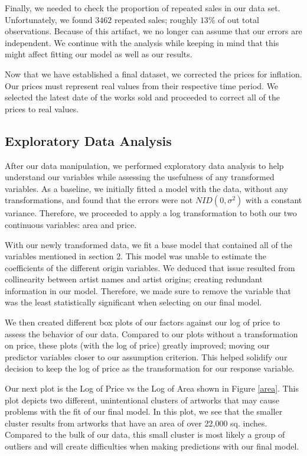 \documentclass[]{asaproc}\usepackage[]{graphicx}\usepackage[]{color}
\begin{document}
Finally, we needed to check the proportion of repeated sales in our data set. Unfortunately, we found $3462$ repeated sales; roughly $13$\% of out total observations. Because of this artifact, we no longer can assume that our errors are independent. We continue with the analysis while keeping in mind that this might affect fitting our model as well as our results.

Now that we have established a final dataset, we corrected the prices for inflation. Our prices must represent real values from their respective time period. We selected the latest date of the works sold and proceeded to correct all of the prices to real values.

\subsection{Exploratory Data Analysis}

After our data manipulation, we performed exploratory data analysis to help understand our variables while assessing the usefulness of any transformed variables. As a baseline, we initially fitted a model with the data, without any transformations, and found that the errors were not $NID(0,\sigma^2)$ with a constant variance. Therefore, we proceeded to apply a log transformation to both our two continuous variables: area and price. 

With our newly transformed data, we fit a base model that contained all of the variables mentioned in section 2. This model was unable to estimate the coefficients of the different origin variables. We deduced that issue resulted from collinearity between artist names and artist origins; creating redundant information in our model. Therefore, we made sure to remove the variable that was the least statistically significant when selecting on our final model.

We then created different box plots of our factors against our log of price to assess the behavior of our data. Compared to our plots without a transformation on price, these plots (with the log of price) greatly improved; moving our predictor variables closer to our assumption criterion. This helped solidify our decision to keep the log of price as the transformation for our response variable. 

Our next plot is the Log of Price vs the Log of Area shown in Figure \ref{area}. This plot depicts two different, unintentional clusters of artworks that may cause problems with the fit of our final model. In this plot, we see that the smaller cluster results from artworks that have an area of over 22,000 sq. inches. Compared to the bulk of our data, this small cluster is most likely a group of outliers and will create difficulties when making predictions with our final model.
\end{document}
